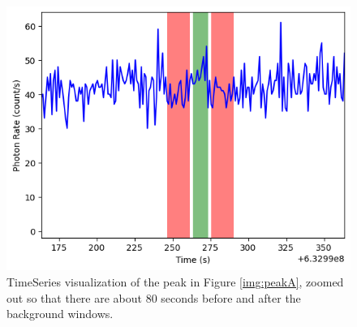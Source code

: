\documentclass{article}
\begin{document}
\begin{figure}[h]
    \centering
    \includegraphics[scale=0.5]{333_ts_zoomout.png}
    \caption{TimeSeries visualization of the peak in Figure \ref{img:peakA}, zoomed out so that there are about 80 seconds before and after the background windows.}
    \label{img:zoomA}
\end{figure}
\end{document}
